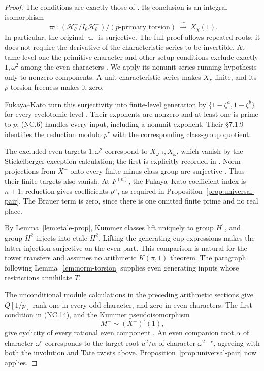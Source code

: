 \begin{proof}
The conditions are exactly those of
\cite[Corollary~8.1.3(2), p.~49]{WakeWangEricksonPseudo2018}.
Its conclusion is an integral isomorphism
\[
 \varpi:
 (\mathcal H^-_\theta/I_\theta\mathcal H^-_\theta)/
           (p\text{-primary torsion})
       \ \xrightarrow{\ \sim\ }\ X_\chi(1).
\]
In particular, the original \(\varpi\) is surjective.
The full proof allows repeated roots; it does not require the
derivative of the characteristic series to be invertible.
At tame level one the primitive-character and other setup
conditions exclude exactly \(1,\omega^2\) among the even
characters \cite[\S1.1, pp.~2--3]{WakeWangEricksonPseudo2018}.
We apply its nonunit-series running hypothesis only to nonzero
components.  A unit characteristic series makes \(X_\chi\)
finite, and its \(p\)-torsion freeness makes it zero.

Fukaya--Kato turn this surjectivity into finite-level generation
by \(\{1-\zeta^a,1-\zeta^b\}\) for every cyclotomic level
\cite[\S\S7.1.8--7.1.10, p.~86]{FukayaKato2012}.
Their exponents are nonzero and at least one is prime to \(p\);
(NC.6) handles every input, including a nonunit exponent.
Their \S7.1.9 identifies the reduction modulo \(p^r\) with
the corresponding class-group quotient.

The excluded even targets \(1,\omega^2\) correspond to
\(X_{\omega^{-1}},X_\omega\), which vanish by the
Stickelberger exception calculation; the first is explicitly
recorded in \cite[proof of Lemma~5.2.7, p.~13]{WakeWangErickson2017}.
Norm projections from \(X^-\) onto every finite minus class
group are surjective
\cite[Proposition~3.4.1 and proof, pp.~90--91]{SharifiIwasawaNotes}.
Thus their finite targets also vanish.  At \(F^{(n)}\), the
Fukaya--Kato coefficient index is \(n+1\); reduction gives
coefficients \(p^n\), as required in
Proposition~\ref{prop:universal-pair}.  The Brauer term is zero,
since there is one omitted finite prime and no real place.

By Lemma~\ref{lem:etale-prop}, Kummer classes lift uniquely to
group \(H^1\), and group \(H^2\) injects into etale \(H^2\).
Lifting the generating cup expressions makes the latter
injection surjective on the even part.  This comparison is
natural for the tower transfers and assumes no arithmetic
\(K(\pi,1)\) theorem.  The paragraph following
Lemma~\ref{lem:norm-torsion} supplies even generating inputs
whose restrictions annihilate \(T\).

The unconditional module calculations in the preceding
arithmetic sections give \(Q[1/p]\) rank one in every odd
character, and zero in even characters.  The first condition
in (NC.14), and the Kummer pseudoisomorphism
\[
                         M^+\sim(X^-)^\iota(1),
\]
give cyclicity of every rational even component
\cite[Proposition~3.4.7 and Corollary~3.4.8, p.~92]{SharifiIwasawaNotes}.
An even companion root \(\alpha\) of character \(\omega^e\)
corresponds to the target root \(u^2/\alpha\) of character
\(\omega^{2-e}\), agreeing with both the involution and Tate
twists above.  Proposition~\ref{prop:universal-pair} now applies.
\end{proof}


